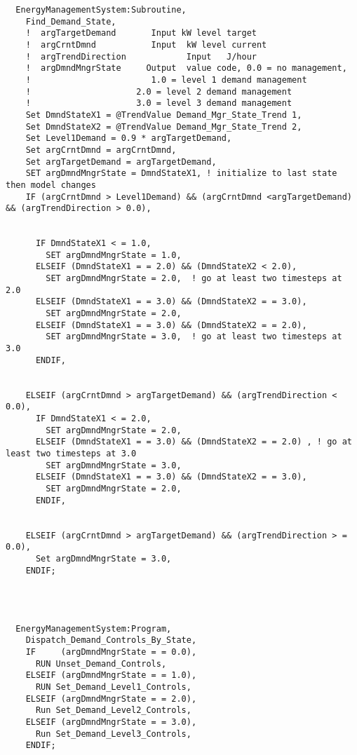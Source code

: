 \begin{lstlisting}
  EnergyManagementSystem:Subroutine,
    Find_Demand_State,
    !  argTargetDemand       Input kW level target
    !  argCrntDmnd           Input  kW level current
    !  argTrendDirection            Input   J/hour
    !  argDmndMngrState     Output  value code, 0.0 = no management,
    !                        1.0 = level 1 demand management
    !                     2.0 = level 2 demand management
    !                     3.0 = level 3 demand management
    Set DmndStateX1 = @TrendValue Demand_Mgr_State_Trend 1,
    Set DmndStateX2 = @TrendValue Demand_Mgr_State_Trend 2,
    Set Level1Demand = 0.9 * argTargetDemand,
    Set argCrntDmnd = argCrntDmnd,
    Set argTargetDemand = argTargetDemand,
    SET argDmndMngrState = DmndStateX1, ! initialize to last state then model changes
    IF (argCrntDmnd > Level1Demand) && (argCrntDmnd <argTargetDemand) && (argTrendDirection > 0.0),


      IF DmndStateX1 < = 1.0,
        SET argDmndMngrState = 1.0,
      ELSEIF (DmndStateX1 = = 2.0) && (DmndStateX2 < 2.0),
        SET argDmndMngrState = 2.0,  ! go at least two timesteps at 2.0
      ELSEIF (DmndStateX1 = = 3.0) && (DmndStateX2 = = 3.0),
        SET argDmndMngrState = 2.0,
      ELSEIF (DmndStateX1 = = 3.0) && (DmndStateX2 = = 2.0),
        SET argDmndMngrState = 3.0,  ! go at least two timesteps at 3.0
      ENDIF,


    ELSEIF (argCrntDmnd > argTargetDemand) && (argTrendDirection < 0.0),
      IF DmndStateX1 < = 2.0,
        SET argDmndMngrState = 2.0,
      ELSEIF (DmndStateX1 = = 3.0) && (DmndStateX2 = = 2.0) , ! go at least two timesteps at 3.0
        SET argDmndMngrState = 3.0,
      ELSEIF (DmndStateX1 = = 3.0) && (DmndStateX2 = = 3.0),
        SET argDmndMngrState = 2.0,
      ENDIF,


    ELSEIF (argCrntDmnd > argTargetDemand) && (argTrendDirection > = 0.0),
      Set argDmndMngrState = 3.0,
    ENDIF;




  EnergyManagementSystem:Program,
    Dispatch_Demand_Controls_By_State,
    IF     (argDmndMngrState = = 0.0),
      RUN Unset_Demand_Controls,
    ELSEIF (argDmndMngrState = = 1.0),
      RUN Set_Demand_Level1_Controls,
    ELSEIF (argDmndMngrState = = 2.0),
      Run Set_Demand_Level2_Controls,
    ELSEIF (argDmndMngrState = = 3.0),
      Run Set_Demand_Level3_Controls,
    ENDIF;





\end{lstlisting}
